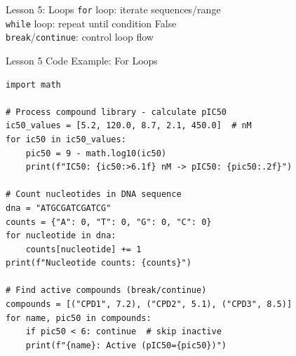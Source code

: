 \documentclass{beamer}
\begin{document}
\begin{frame}{Lesson 5: Loops}
    \small
    \texttt{for} loop: iterate sequences/range\\
    \texttt{while} loop: repeat until condition False\\
    \texttt{break}/\texttt{continue}: control loop flow
    \vspace{0.5em}
    \begin{center}
    \end{center}
\end{frame}

\begin{frame}[fragile]{Lesson 5 Code Example: For Loops}
    \small
    \begin{lstlisting}[style=codeStyle]
import math

# Process compound library - calculate pIC50
ic50_values = [5.2, 120.0, 8.7, 2.1, 450.0]  # nM
for ic50 in ic50_values:
    pic50 = 9 - math.log10(ic50)
    print(f"IC50: {ic50:>6.1f} nM -> pIC50: {pic50:.2f}")

# Count nucleotides in DNA sequence
dna = "ATGCGATCGATCG"
counts = {"A": 0, "T": 0, "G": 0, "C": 0}
for nucleotide in dna:
    counts[nucleotide] += 1
print(f"Nucleotide counts: {counts}")

# Find active compounds (break/continue)
compounds = [("CPD1", 7.2), ("CPD2", 5.1), ("CPD3", 8.5)]
for name, pic50 in compounds:
    if pic50 < 6: continue  # skip inactive
    print(f"{name}: Active (pIC50={pic50})")
    \end{lstlisting}
\end{frame}
\end{document}
